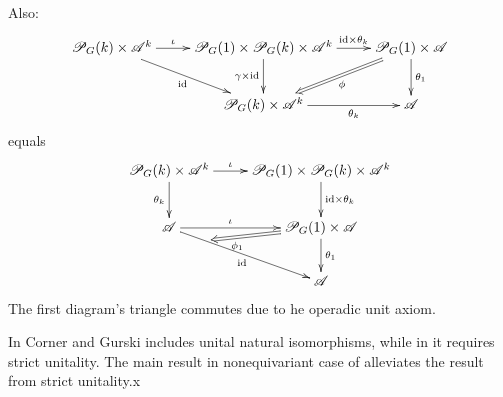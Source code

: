 \documentclass{article}
\begin{document}
\begin{defn}[$\cP_G$-pseudoalgebra]
\begin{itemize}
        Also:
        \begin{align*}
            \xymatrix{
                \cP_G(k)\times\A^k\ar[r]^-{\iota} \ar[dr]_-{\id} & \cP_G(1)\times\cP_G(k)\times \A^k \ar[r]^-{\id\times\theta_k} \ar[d]_-{\gamma\times\id} & \cP_G(1)\times\A \ar[d]^-{\theta_1} \ar@{=>}[dl]^-{\phi}\\
                &\cP_G(k)\times\A^k \ar[r]_-{\theta_k} & \A
            }
        \end{align*}
        equals
        \begin{align*}
            \xymatrix{
                \cP_G(k)\times \A^k \ar[r]^-{\iota} \ar[d]_-{\theta_k} & \cP_G(1)\times\cP_G(k)\times \A^k \ar[d]^-{\id\times\theta_k}\\
                \A \ar[r]^-{\iota} \ar[dr]_-{\id} & \cP_G(1)\times\A \ar[d]^-{\theta_1} \ar@{=>}[dl]+<30pt>^>>>>>>>{\phi_1}\\
                & \A
            }
        \end{align*}
        The first diagram's triangle commutes due to he operadic unit axiom.
    \end{itemize}
\end{defn}

\hfil

\begin{rem}
    In \cite{CG14} Corner and Gurski includes unital natural isomorphisms, while in \cite{GMMO20} it requires strict unitality. The main result in nonequivariant case of \cite{LMRZ26} alleviates the result from strict unitality.x
\end{rem}

\hfil
\end{document}
